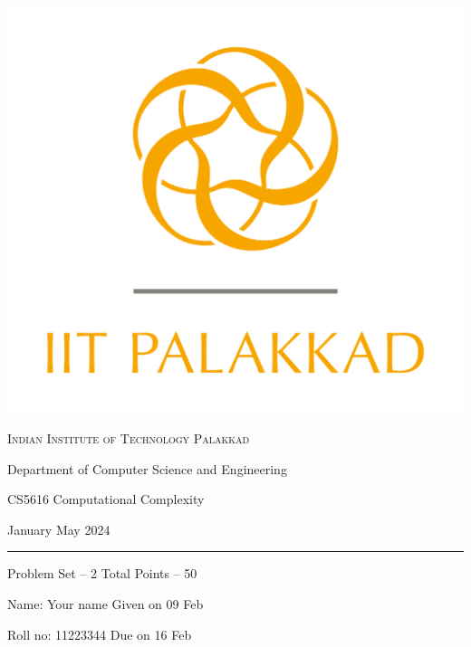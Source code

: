 \documentclass[11pt, a4paper,answers]{exam}
\begin{document}
	\noindent
	\begin{minipage}[l]{0.1\textwidth}
		\noindent
		\includegraphics[width=2.4\textwidth]{iitpkd}
	\end{minipage}
	\hfill
	\begin{minipage}[c]{0.8\textwidth}
		\begin{center}
			{\large \textsc{\textcolor{iitpkdcolor}{Indian Institute of Technology Palakkad}} \par
				\small	Department of Computer Science and Engineering	\par
				\large	CS5616 Computational Complexity \par 
				\small January May 2024}
		\end{center}
	\end{minipage}
	\par
	\vspace{2mm}
	\hrule
	\vspace{2mm}
	\begin{minipage}{0.9\textwidth} 
		\textsf{Problem Set} -- 2  \hfill  \textsf{Total Points} -- 50
		
		{\small \textsf{Name}: Your name    \hfill \small \textsf{Given on} 09 Feb}
		
		{\small \textsf{Roll no}: 11223344  \hfill \small \textsf{Due on} 16 Feb}
	\end{minipage}
	\vspace{0.2in}
	\noindent
	
\end{document}
